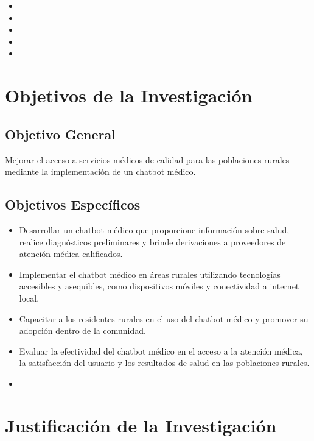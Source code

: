 \begin{itemize}
	\item \Pbone
	\item \Pbtwo
	\item \Pbthree
	\item \Pbfour
	\item \Pbfive
\end{itemize}

\section{Objetivos de la Investigación}

\subsection{Objetivo General}
\newcommand{\ObjetivoGeneral}{
Mejorar el acceso a servicios médicos de calidad para las poblaciones rurales mediante la implementación de un chatbot médico.
}
\ObjetivoGeneral
\subsection{Objetivos Espec\'{i}ficos}
\newcommand{\Objone}{
Desarrollar un chatbot médico que proporcione información sobre salud, realice diagnósticos preliminares y brinde derivaciones a proveedores de atención médica calificados.
}
\newcommand{\Objtwo}{
Implementar el chatbot médico en áreas rurales utilizando tecnologías accesibles y asequibles, como dispositivos móviles y conectividad a internet local.
}
\newcommand{\Objthree}{
Capacitar a los residentes rurales en el uso del chatbot médico y promover su adopción dentro de la comunidad.
}
\newcommand{\Objfour}{
Evaluar la efectividad del chatbot médico en el acceso a la atención médica, la satisfacción del usuario y los resultados de salud en las poblaciones rurales.
}
\newcommand{\Objfive}{

}

\begin{itemize}
	\item {\Objone}
	\item {\Objtwo}
	\item {\Objthree}
	\item {\Objfour}
	\item {\Objfive}
\end{itemize}

\section{Justificación de la Investigación}

